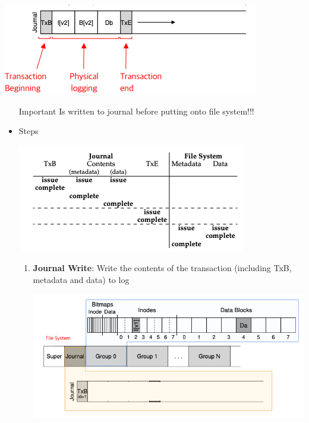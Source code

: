 \documentclass[12pt]{article}
\begin{document}
\begin{center}
\includegraphics[width=0.8\linewidth]{../images/midterm_4_solution_35.png}
\end{center}

\begin{itemize}
    \item [\color{red}Important\color{black}] Is written to journal before putting onto file system!!!
    \item Steps

    \begin{center}
    \includegraphics[width=0.8\linewidth]{../images/midterm_4_solution_41.png}
    \end{center}

    \begin{enumerate}[1.]
        \item \textbf{Journal Write}: Write the contents of the transaction (including TxB, metadata and data)
        to log

        \begin{center}
        \includegraphics[width=0.8\linewidth]{../images/midterm_4_solution_36.png}
        \end{center}


\end{enumerate}
\end{itemize}
\end{document}
